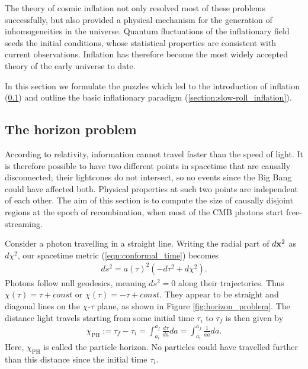 The theory of cosmic inflation not only resolved most of these problems successfully, but also provided a physical mechanism for the generation of inhomogeneities in the universe. Quantum fluctuations of the inflationary field seeds the initial conditions, whose statistical properties are consistent with current observations. Inflation has therefore become the most widely accepted theory of the early universe to date.

In this section we formulate the puzzles which led to the introduction of inflation (\ref{section:the_horizon_problem}) and outline the basic inflationary paradigm (\ref{section:slow-roll_inflation}).

\subsection{The horizon problem}
\label{section:the_horizon_problem}

According to relativity, information cannot travel faster than the speed of light. It is therefore possible to have two different points in spacetime that are causally disconnected; their lightcones do not intersect, so no events since the Big Bang could have affected both. Physical properties at such two points are independent of each other. The aim of this section is to compute the size of causally disjoint regions at the epoch of recombination, when most of the CMB photons start free-streaming.

Consider a photon travelling in a straight line. Writing the radial part of $d\mathbf{x}^2$ as $d\chi^2$, our spacetime metric (\ref{eqn:conformal_time}) becomes
\begin{align}
	ds^2 = a(\tau)^2 (-d\tau^2 +d\chi^2).
\end{align}
Photons follow null geodesics, meaning $ds^2=0$ along their trajectories. Thus $\chi(\tau) = \tau + const$ or $\chi(\tau) = -\tau + const$. They appear to be straight and diagonal lines on the $\chi$-$\tau$ plane, as shown in Figure \ref{fig:horizon_problem}. The distance light travels starting from some initial time $\tau_i$ to $\tau_f$ is then given by
\begin{align}
	\chi_\text{PH} := \tau_f - \tau_i = \int_{a_i}^{a_f} \frac{d\tau}{da} da = \int_{a_i}^{a_f} \frac{1}{a\dot{a}} da. \label{def:physical_horizon}
\end{align}
Here, $\chi_\text{PH}$ is called the particle horizon. No particles could have travelled further than this distance since the initial time $\tau_i$.

